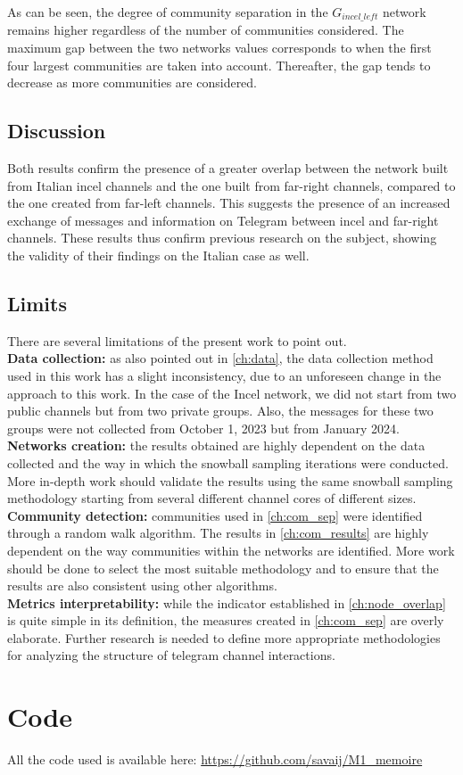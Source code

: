 \documentclass[a4paper,twoside,12pt, openany]{book}
\begin{document}
As can be seen, the degree of community separation in the $G_{incel\_left}$ network remains higher regardless of the number of communities considered. The maximum gap between the two networks values corresponds to when the first four largest communities are taken into account. Thereafter, the gap tends to decrease as more communities are considered.

\section{Discussion}
Both results confirm the presence of a greater overlap between the network built from Italian incel channels and the one built from far-right channels, compared to the one created from far-left channels. This suggests the presence of an increased exchange of messages and information on Telegram between incel and far-right channels. These results thus confirm previous research on the subject, showing the validity of their findings on the Italian case as well. 

\section{Limits}
There are several limitations of the present work to point out.\\
\textbf{Data collection:} as also pointed out in \ref{ch:data}, the data collection method used in this work has a slight inconsistency, due to an unforeseen change in the approach to this work. In the case of the Incel network, we did not start from two public channels but from two private groups. Also, the messages for these two groups were not collected from October 1, 2023 but from January 2024.\\
\textbf{Networks creation:} the results obtained are highly dependent on the data collected and the way in which the snowball sampling iterations were conducted. More in-depth work should validate the results using the same snowball sampling methodology starting from several different channel cores of different sizes.\\
\textbf{Community detection:} communities used in \ref{ch:com_sep} were identified through a random walk algorithm. The results in \ref{ch:com_results} are highly dependent on the way communities within the networks are identified. More work should be done to select the most suitable methodology and to ensure that the results are also consistent using other algorithms.\\
\textbf{Metrics interpretability:} while the indicator established in \ref{ch:node_overlap} is quite simple in its definition, the measures created in \ref{ch:com_sep} are overly elaborate. Further research is needed to define more appropriate methodologies for analyzing the structure of telegram channel interactions.

\chapter{Code}
All the code used is available here: \url{https://github.com/savaij/M1\_memoire}


\backmatter


\titleformat{\chapter}[display]
{\normalfont\bfseries}{}{-3em}{\Huge}

\listoffigures
\listoftables
\tableofcontents
\end{document}
